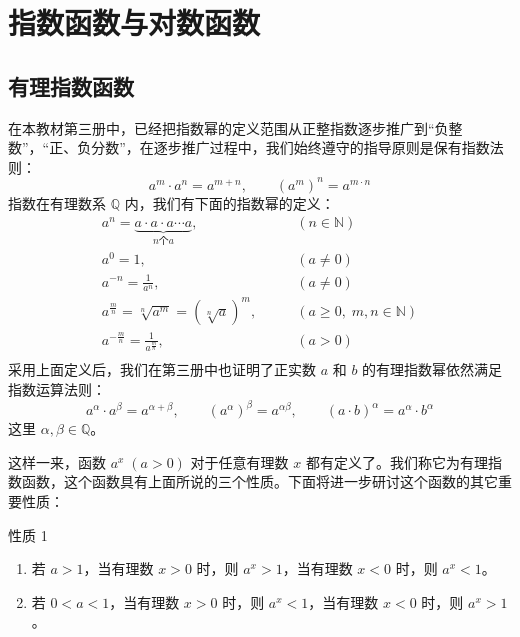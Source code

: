 \chapter{指数函数与对数函数}
\section{有理指数函数}
在本教材第三册中，已经把指数幂的定义范围从正整指数逐步推广到“负整数”，“正、负分数”，在逐步推广过程中，我们始终遵守的指导原则是保有指数法则：
\[a^m\cdot a^n=a^{m+n},\qquad  (a^m)^n=a^{m\cdot n}\]
指数在有理数系 $\mathbb{Q}$ 内，我们有下面的指数幂的定义：
\[\begin{split}
  a^n=\underbrace{a\cdot a\cdot a\cdots a}_{\text{$n$个$a$}},&\qquad (n\in\mathbb{N})\\  
a^0=1,&\qquad (a\ne 0)\\  
a^{-n}=\frac{1}{a^n},&\qquad (a\ne 0)\\ 
a^{\tfrac{m}{n}}=\sqrt[n]{a^m}=\left(\sqrt[n]{a}\right)^m,&\qquad (a\geqslant 0,\; m,n\in\mathbb{N})\\ 
a^{-\tfrac{m}{n}}=\frac{1}{a^{\tfrac{m}{n}}},&\qquad (a> 0)\\ 
\end{split}\]
采用上面定义后，我们在第三册中也证明了正实数 $a$ 和 $b$ 的有理指数幂依然满足指数运算法则：
\[a^{\alpha}\cdot a^{\beta}=a^{\alpha+\beta},\qquad (a^{\alpha})^{\beta}=a^{\alpha\beta},\qquad (a\cdot b)^{\alpha}=a^{\alpha}\cdot b^{\alpha}\]
这里 $\alpha,\beta \in \mathbb{Q}$。

这样一来，函数 $a^x\; (a>0)$ 对于任意有理数 $x$ 都有定义了。我们称它为有理指数函数，这个函数具有上面所说的三个性质。下面将进一步研讨这个函数的其它重要性质：

\begin{Theorem}{性质 1}
\begin{enumerate}
  \item 若 $a>1$，当有理数 $x>0$ 时，则 $a^x>1$，当有理数 $x<0$ 时，则 $a^x<1$。
  \item 若 $0<a<1$，当有理数 $x>0$ 时，则 $a^x<1$，当有理数 $x<0$ 时，则 $a^x>1$。
\end{enumerate}
\end{Theorem}

